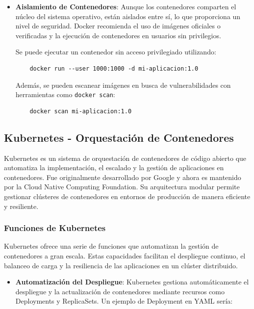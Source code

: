 {                \begin{itemize}
                    \item \textbf{Aislamiento de Contenedores}: Aunque los contenedores comparten el núcleo del sistema operativo, están aislados entre sí, lo que proporciona un nivel de seguridad. Docker recomienda el uso de imágenes oficiales o verificadas y la ejecución de contenedores en usuarios sin privilegios.
                
                    Se puede ejecutar un contenedor sin acceso privilegiado utilizando:
                
                    \begin{verbatim}
    docker run --user 1000:1000 -d mi-aplicacion:1.0
                    \end{verbatim}
                
                    Además, se pueden escanear imágenes en busca de vulnerabilidades con herramientas como \texttt{docker scan}:
                
                    \begin{verbatim}
    docker scan mi-aplicacion:1.0
                    \end{verbatim}
                \end{itemize}
            
        \subsection{Kubernetes - Orquestación de Contenedores}
            Kubernetes es un sistema de orquestación de contenedores de código abierto que automatiza la implementación, el escalado y la gestión de aplicaciones en contenedores. Fue originalmente desarrollado por Google y ahora es mantenido por la Cloud Native Computing Foundation. Su arquitectura modular permite gestionar clústeres de contenedores en entornos de producción de manera eficiente y resiliente.
            
            \subsubsection{Funciones de Kubernetes}
                Kubernetes ofrece una serie de funciones que automatizan la gestión de contenedores a gran escala. Estas capacidades facilitan el despliegue continuo, el balanceo de carga y la resiliencia de las aplicaciones en un clúster distribuido.

                \begin{itemize}
                    \item \textbf{Automatización del Despliegue}: Kubernetes gestiona automáticamente el despliegue y la actualización de contenedores mediante recursos como Deployments y ReplicaSets. Un ejemplo de Deployment en YAML sería:
                

\end{itemize}}
